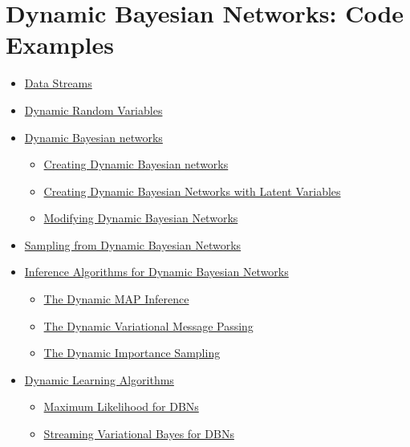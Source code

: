 \documentclass[10pt,a4paper]{article}
\begin{document}
\section{Dynamic Bayesian Networks: Code Examples}\label{sec:dbns}


\begin{itemize}
	\item \hyperref[sec:dbns:datastreams]{Data Streams}
	\item \hyperref[sec:dbns:variables]{Dynamic Random Variables}
	\item \hyperref[sec:dbns:dbns]{Dynamic Bayesian networks}
	\begin{itemize}
		\item \hyperref[sec:dbns:dbns:creating]{Creating Dynamic Bayesian networks}
		\item \hyperref[sec:dbns:dbns:creatingLatent]{Creating Dynamic Bayesian Networks with Latent Variables}
		\item \hyperref[sec:dbns:dbns:modif]{Modifying Dynamic Bayesian Networks}
	\end{itemize}
	\item \hyperref[sec:dbns:sampling]{Sampling from Dynamic Bayesian Networks}
	\item \hyperref[sec:dbns:inference]{Inference Algorithms for Dynamic Bayesian Networks}
	\begin{itemize}
		\item \hyperref[sec:dbns:inference:dmap]{The Dynamic MAP Inference}
		\item \hyperref[sec:dbns:inference:dvmp]{The Dynamic Variational Message Passing}
		\item \hyperref[sec:dbns:inference:dis]{The Dynamic Importance Sampling}
	\end{itemize}
	\item \hyperref[sec:dbns:learning]{Dynamic Learning Algorithms}
	\begin{itemize}
		\item \hyperref[sec:dbns:learning:ml]{Maximum Likelihood for DBNs}
		\item \hyperref[sec:dbns:learning:sv]{Streaming Variational Bayes for DBNs}
	\end{itemize}
\end{itemize}
\end{document}
